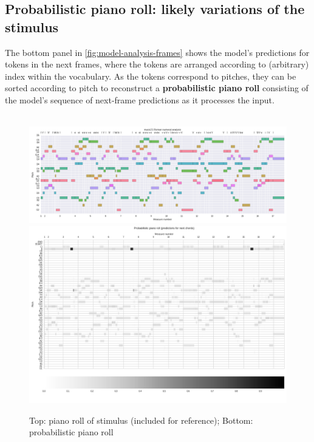 \documentclass[dissertation.tex]{subfiles}
\begin{document}
\subsection{Probabilistic piano roll: likely variations of the stimulus}

The bottom panel in \autoref{fig:model-analysis-frames} shows the model's predictions
for tokens in the next frames, where the tokens are arranged according to (arbitrary)
index within the vocabulary. As the tokens correspond to pitches, they can be sorted
according to pitch to reconstruct a {\bf probabilistic piano roll}\cite{eck2008learning}
consisting of the model's sequence of next-frame predictions as it processes the input.

\begin{figure}[htpb]
    \centering
    ~~\includegraphics[width=0.99\linewidth]{Figures/model-analysis-input-piano-roll.png}
    \includegraphics[trim={0 0 0 1.4cm},clip,width=1.0\linewidth]{Figures/model-analysis-probabilistic-piano-roll.png}
    \caption{Top: piano roll of stimulus (included for reference); Bottom: probabilistic piano roll}
    \label{fig:model-analysis-probabilistic-piano-roll}
\end{figure}
\end{document}
